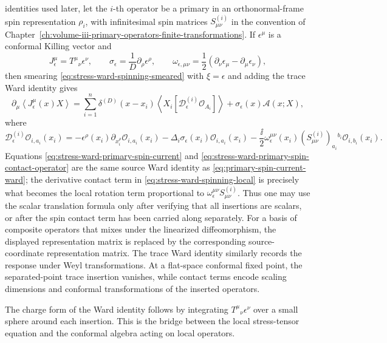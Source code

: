 \begin{proposition}
identities used later, let the \(i\)-th operator be a primary in an
orthonormal-frame spin representation \(\rho_i\), with infinitesimal spin
matrices \(S^{(i)}_{\mu\nu}\) in the convention of
Chapter~\ref{ch:volume-iii-primary-operators-finite-transformations}.  If
\(\epsilon^\mu\) is a conformal Killing vector and
\[
  J^\mu_\epsilon=T^\mu{}_\nu\epsilon^\nu,
  \qquad
  \sigma_\epsilon=\frac1D\partial_\rho\epsilon^\rho,
  \qquad
  \omega_{\epsilon,\mu\nu}
  =\frac12(\partial_\nu\epsilon_\mu-\partial_\mu\epsilon_\nu),
\]
then smearing \eqref{eq:stress-ward-spinning-smeared} with
\(\xi=\epsilon\) and adding the trace Ward identity gives
\begin{equation}
  \partial_\mu
  \left\langle J^\mu_\epsilon(x)X\right\rangle
  =
  \sum_{i=1}^n
  \delta^{(D)}(x-x_i)
  \left\langle
    X_i[\mathcal D^{(i)}_\epsilon\mathcal O_{A_i}]
  \right\rangle
  +
  \sigma_\epsilon(x)\mathcal A(x;X),
  \label{eq:stress-ward-primary-spin-current}
\end{equation}
where
\begin{equation}
  \mathcal D^{(i)}_\epsilon\mathcal O_{i,a_i}(x_i)
  =
  -\epsilon^\rho(x_i)\partial_{x_i^\rho}\mathcal O_{i,a_i}(x_i)
  -\Delta_i\sigma_\epsilon(x_i)\mathcal O_{i,a_i}(x_i)
  -\frac{\ii}{2}\omega_\epsilon^{\mu\nu}(x_i)
  (S^{(i)}_{\mu\nu})_{a_i}{}^{b_i}
  \mathcal O_{i,b_i}(x_i).
  \label{eq:stress-ward-primary-spin-contact-operator}
\end{equation}
Equations \eqref{eq:stress-ward-primary-spin-current} and
\eqref{eq:stress-ward-primary-spin-contact-operator} are the same source
Ward identity as \eqref{eq:primary-spin-current-ward}; the derivative
contact term in \eqref{eq:stress-ward-spinning-local} is precisely what
becomes the local rotation term proportional to
\(\omega_\epsilon^{\mu\nu}S^{(i)}_{\mu\nu}\).  Thus one may use the scalar
translation formula only after verifying that all insertions are scalars, or
after the spin contact term has been carried along separately.
For a basis of composite operators that mixes under the linearized
diffeomorphism, the displayed representation matrix is replaced by the
corresponding source-coordinate representation matrix.  The trace Ward identity
similarly records the response under Weyl transformations.  At a flat-space
conformal fixed point, the separated-point trace insertion vanishes, while
contact terms encode scaling dimensions and conformal transformations of the
inserted operators.

The charge form of the Ward identity follows by integrating
\(T^\mu{}_\nu\epsilon^\nu\) over a small sphere around each insertion.  This
is the bridge between the local stress-tensor equation and the conformal
algebra acting on local operators.
\end{proposition}
